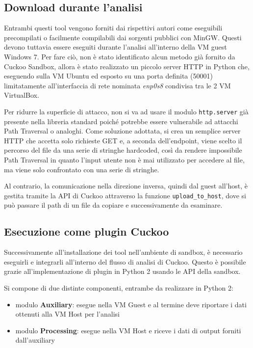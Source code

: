 \subsection{Download durante l'analisi}
Entrambi questi tool vengono forniti dai rispettivi autori come eseguibili precompilati o facilmente compilabili dai sorgenti pubblici con MinGW.
Questi devono tuttavia essere eseguiti durante l'analisi all'interno della VM guest Windows 7. Per fare ciò, non è stato identificato alcun metodo già fornito da Cuckoo Sandbox, allora è stato realizzato un piccolo server HTTP in Python che, eseguendo sulla VM Ubuntu ed esposto su una porta definita (50001) limitatamente all'interfaccia di rete nominata \emph{enp0s8} condivisa tra le 2 VM VirtualBox.

Per ridurre la superficie di attacco, non si va ad usare il modulo \texttt{http.server} già presente nella libreria standard poiché potrebbe essere vulnerabile ad attacchi Path Traversal o analoghi.
Come soluzione adottata, si crea un semplice server HTTP che accetta solo richieste GET e, a seconda dell'endpoint, viene scelto il percorso del file da una serie di stringhe hardcoded, così da rendere impossibile Path Traversal in quanto l'input utente non è mai utilizzato per accedere al file, ma viene solo confrontato con una serie di stringhe.

Al contrario, la comunicazione nella direzione inversa, quindi dal guest all'host, è gestita tramite la API di Cuckoo attraverso la funzione \texttt{upload\_to\_host}, dove si può passare il path di un file da copiare e successivamente da esaminare.

\subsection{Esecuzione come plugin Cuckoo}
Successivamente all'installazione dei tool nell'ambiente di sandbox, è necessario eseguirli e integrarli all'interno del flusso di analisi di Cuckoo.
Questo è possibile grazie all'implementazione di plugin in Python 2 usando le API della sandbox.

Si compone di due distinte componenti, entrambe da realizzare in Python 2:
\begin{itemize}
    \item modulo \textbf{Auxiliary}: esegue nella VM Guest e al termine deve riportare i dati ottenuti alla VM Host per l'analisi
    \item modulo \textbf{Processing}: esegue nella VM Host e riceve i dati di output forniti dall'auxiliary
\end{itemize}

